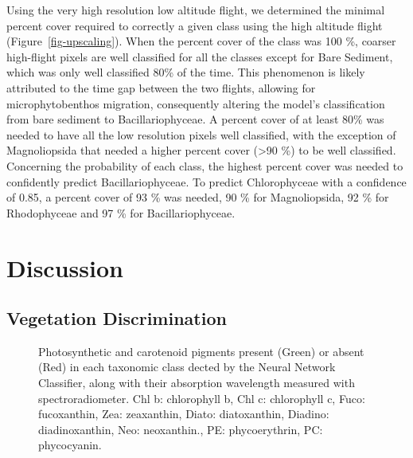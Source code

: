 \documentclass[
  number]{elsarticle}
\begin{document}
Using the very high resolution low altitude flight, we determined the
minimal percent cover required to correctly a given class using the high
altitude flight (Figure~\ref{fig-upscaling}). When the percent cover of
the class was 100 \%, coarser high-flight pixels are well classified for
all the classes except for Bare Sediment, which was only well classified
80\% of the time. This phenomenon is likely attributed to the time gap
between the two flights, allowing for microphytobenthos migration,
consequently altering the model's classification from bare sediment to
Bacillariophyceae. A percent cover of at least 80\% was needed to have
all the low resolution pixels well classified, with the exception of
Magnoliopsida that needed a higher percent cover (\textgreater90 \%) to
be well classified. Concerning the probability of each class, the
highest percent cover was needed to confidently predict
Bacillariophyceae. To predict Chlorophyceae with a confidence of 0.85, a
percent cover of 93 \% was needed, 90 \% for Magnoliopsida, 92 \% for
Rhodophyceae and 97 \% for Bacillariophyceae.

\section{Discussion}\label{discussion}

\subsection{Vegetation Discrimination}\label{vegetation-discrimination}

\label{cell-fig-Pigm}
\begin{figure}[H]


\caption{\label{fig-Pigm}Photosynthetic and carotenoid pigments present
(Green) or absent (Red) in each taxonomic class dected by the Neural
Network Classifier, along with their absorption wavelength measured with
spectroradiometer. Chl b: chlorophyll b, Chl c: chlorophyll c, Fuco:
fucoxanthin, Zea: zeaxanthin, Diato: diatoxanthin, Diadino:
diadinoxanthin, Neo: neoxanthin., PE: phycoerythrin, PC: phycocyanin.}

\end{figure}%
\end{document}
